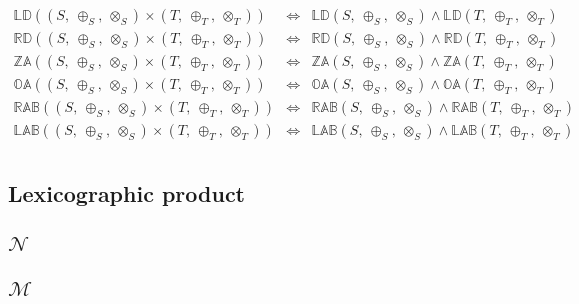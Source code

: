 \documentclass[10pt]{report}
\newcommand{\propname}[1]{{\mathbb{#1}}}
\begin{document}
\[
\begin{array}{rcl} 
\propname{LD}((S,\ \oplus_S,\ \otimes_S) \times (T,\ \oplus_T,\ \otimes_T)) 
   & \Leftrightarrow %
   & \propname{LD}(S,\ \oplus_S,\ \otimes_S) \wedge \propname{LD}(T,\ \oplus_T,\ \otimes_T)\\ 
\propname{RD}((S,\ \oplus_S,\ \otimes_S) \times (T,\ \oplus_T,\ \otimes_T)) 
   & \Leftrightarrow %
   & \propname{RD}(S,\ \oplus_S,\ \otimes_S) \wedge \propname{RD}(T,\ \oplus_T,\ \otimes_T) 
  \\ 
\propname{ZA}((S,\ \oplus_S,\ \otimes_S) \times (T,\ \oplus_T,\ \otimes_T)) 
    & \Leftrightarrow %
    & \propname{ZA}(S,\ \oplus_S,\ \otimes_S) \wedge \propname{ZA}(T,\ \oplus_T,\ \otimes_T)
   \\
\propname{OA}((S,\ \oplus_S,\ \otimes_S) \times (T,\ \oplus_T,\ \otimes_T)) 
    & \Leftrightarrow %
    & \propname{OA}(S,\ \oplus_S,\ \otimes_S) \wedge \propname{OA}(T,\ \oplus_T,\ \otimes_T)
   \\
\propname{RAB}((S,\ \oplus_S,\ \otimes_S) \times (T,\ \oplus_T,\ \otimes_T)) 
    & \Leftrightarrow %
    & \propname{RAB}(S,\ \oplus_S,\ \otimes_S) \wedge  \propname{RAB}(T,\ \oplus_T,\ \otimes_T) 
    \\ 
\propname{LAB}((S,\ \oplus_S,\ \otimes_S) \times (T,\ \oplus_T,\ \otimes_T)) 
    & \Leftrightarrow %
    & \propname{LAB}(S,\ \oplus_S,\ \otimes_S) \wedge \propname{LAB}(T,\ \oplus_T,\ \otimes_T)
    \\ 
\end{array} 
\]



\subsection{Lexicographic product} 






\subsection{$\mathcal{N}$} 






\subsection{$\mathcal{M}$} 
\end{document}
